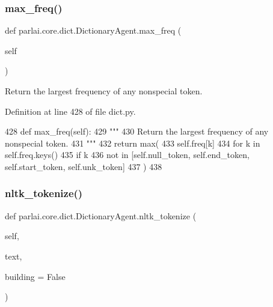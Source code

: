 \subsubsection{\texorpdfstring{max\+\_\+freq()}{max\_freq()}}
{\footnotesize\ttfamily def parlai.\+core.\+dict.\+Dictionary\+Agent.\+max\+\_\+freq (\begin{DoxyParamCaption}\item[{}]{self }\end{DoxyParamCaption})}

\begin{DoxyVerb}Return the largest frequency of any nonspecial token.
\end{DoxyVerb}
 

Definition at line 428 of file dict.\+py.


\begin{DoxyCode}
428     \textcolor{keyword}{def }max\_freq(self):
429         \textcolor{stringliteral}{"""}
430 \textcolor{stringliteral}{        Return the largest frequency of any nonspecial token.}
431 \textcolor{stringliteral}{        """}
432         \textcolor{keywordflow}{return} max(
433             self.freq[k]
434             \textcolor{keywordflow}{for} k \textcolor{keywordflow}{in} self.freq.keys()
435             \textcolor{keywordflow}{if} k
436             \textcolor{keywordflow}{not} \textcolor{keywordflow}{in} [self.null\_token, self.end\_token, self.start\_token, self.unk\_token]
437         )
438 
\end{DoxyCode}
\mbox{\label{classparlai_1_1core_1_1dict_1_1DictionaryAgent_a73fe72e257ace6e8debf2c41995f8390}} 
\subsubsection{\texorpdfstring{nltk\+\_\+tokenize()}{nltk\_tokenize()}}
{\footnotesize\ttfamily def parlai.\+core.\+dict.\+Dictionary\+Agent.\+nltk\+\_\+tokenize (\begin{DoxyParamCaption}\item[{}]{self,  }\item[{}]{text,  }\item[{}]{building = {\ttfamily False} }\end{DoxyParamCaption})}

